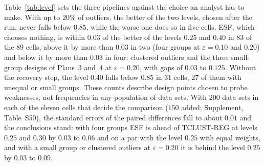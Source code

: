 \begin{table}[htbp]
\centering
\small
\caption{The choice of a trimming level: mean over cells of the mean accuracy on clean units, the
number of cells with a mean below $0.85$, and the worst cell, for all $123$ cells of the study
(Plans~1 to~5 and the third part; the $\varepsilon=0.30$ cells of the first part are excluded,
as the second part replaces them). ``Better'' and ``worse'' of the two levels are chosen in each
cell after the run, between TCLUST-REG at $0.25$ and at $0.40$, each with reweighting and the
recovery step. The last four rows were run after the others: the levels $0.30$ and $0.35$, and
the levels $0.25$ and $0.40$ with equal weights (option \texttt{equalweights} of FSDA), all with
the long search.}
\label{tab:level}
\resizebox{\textwidth}{!}{}
\end{table}

Table~\ref{tab:level} sets the three pipelines against the choice an analyst has to make.
With up to $20\%$ of outliers, the better of the two levels, chosen after the run, never falls
below $0.85$, while the worse one does so in five cells. ESF, which chooses nothing, is within
$0.03$ of the better of the levels $0.25$ and $0.40$ in $83$ of the $89$ cells, above it by
more than $0.03$ in two (four groups at $\varepsilon=0.10$ and $0.20$) and below it by more
than $0.03$ in four: clustered
outliers and the three small-group designs of Plans~3 and~4 at $\varepsilon=0.20$, with gaps of
$0.03$ to $0.125$. Without the recovery step, the level $0.40$ falls below $0.85$ in $31$
cells, $27$ of them with unequal or small groups. These counts describe design points chosen
to probe weaknesses, not frequencies in any population of data sets. With $200$ data sets in
each of the eleven cells that decide the comparison ($150$ added; Supplement, Table~S50), the
standard errors of the paired differences fall to about $0.01$ and the conclusions stand: with
four groups ESF is ahead of TCLUST-REG at levels $0.25$ and $0.30$ by $0.03$ to $0.06$ and on a
par with the level $0.25$ with equal weights, and with a small group or clustered outliers at
$\varepsilon=0.20$ it is behind the level $0.25$ by $0.03$ to $0.09$.

